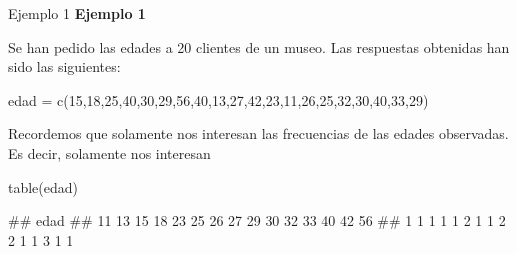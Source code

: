 \documentclass[
  ignorenonframetext,
  aspectratio=169]{beamer}
\newenvironment{Shaded}{\begin{snugshade}}{\end{snugshade}}
\newcommand{\DecValTok}[1]{\textcolor[rgb]{0.00,0.00,0.81}{#1}}
\newcommand{\FunctionTok}[1]{\textcolor[rgb]{0.00,0.00,0.00}{#1}}
\newcommand{\NormalTok}[1]{#1}
\newcommand{\OtherTok}[1]{\textcolor[rgb]{0.56,0.35,0.01}{#1}}
\let\oldverbatim\verbatim
\let\endoldverbatim\endverbatim
\renewenvironment{verbatim}{\tiny\oldverbatim}{\endoldverbatim}
\begin{document}
\begin{frame}[fragile]{Ejemplo 1}
\protect\hypertarget{ejemplo-1-4}{}
\textbf{Ejemplo 1}

Se han pedido las edades a 20 clientes de un museo. Las respuestas
obtenidas han sido las siguientes:

\begin{Shaded}
\begin{Highlighting}[]
\NormalTok{edad }\OtherTok{=} \FunctionTok{c}\NormalTok{(}\DecValTok{15}\NormalTok{,}\DecValTok{18}\NormalTok{,}\DecValTok{25}\NormalTok{,}\DecValTok{40}\NormalTok{,}\DecValTok{30}\NormalTok{,}\DecValTok{29}\NormalTok{,}\DecValTok{56}\NormalTok{,}\DecValTok{40}\NormalTok{,}\DecValTok{13}\NormalTok{,}\DecValTok{27}\NormalTok{,}\DecValTok{42}\NormalTok{,}\DecValTok{23}\NormalTok{,}\DecValTok{11}\NormalTok{,}\DecValTok{26}\NormalTok{,}\DecValTok{25}\NormalTok{,}\DecValTok{32}\NormalTok{,}\DecValTok{30}\NormalTok{,}\DecValTok{40}\NormalTok{,}\DecValTok{33}\NormalTok{,}\DecValTok{29}\NormalTok{)}
\end{Highlighting}
\end{Shaded}

Recordemos que solamente nos interesan las frecuencias de las edades
observadas. Es decir, solamente nos interesan

\begin{Shaded}
\begin{Highlighting}[]
\FunctionTok{table}\NormalTok{(edad)}
\end{Highlighting}
\end{Shaded}

\begin{verbatim}
## edad
## 11 13 15 18 23 25 26 27 29 30 32 33 40 42 56 
##  1  1  1  1  1  2  1  1  2  2  1  1  3  1  1
\end{verbatim}
\end{frame}
\end{document}
